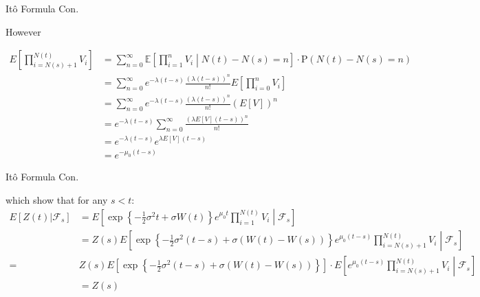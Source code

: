 \documentclass{beamer}
\begin{document}
\begin{frame}{Itô Formula Con.}

    {\footnotesize \footnotesize
    \par However

    \[
    \begin{aligned}
    E \left[ \prod_{i=N(s)+1}^{N(t)} V_i \right] 
    &=\sum_{n=0}^{\infty} \mathbb{E} \left[ \prod_{i=1}^{n} V_i \middle| N(t)-N(s) = n \right] \cdot \text{P}(N(t)-N(s) = n)\\
    &= \sum_{n=0}^{\infty} e^{-\lambda (t-s)} \frac{(\lambda (t-s))^n}{n!} E \left[ \prod_{i=0}^{n} V_i \right] \\
    &= \sum_{n=0}^{\infty} e^{-\lambda (t-s)} \frac{(\lambda (t-s))^n}{n!} (E [V])^n \\
    &= e^{-\lambda (t-s)} \sum_{n=0}^{\infty} \frac{(\lambda E [V] (t-s))^n}{n!} \\
    &= e^{-\lambda (t-s)} e^{\lambda E [V] (t-s)} \\
    &= e^{-\mu_0 (t-s)}
    \end{aligned}
    \]
    }
    
\end{frame}


\begin{frame}{Itô Formula Con.}

    {\footnotesize \footnotesize
    \par which show that for any $s<t$:
    \[
    \begin{aligned}
    E [Z(t) | \mathcal{F}_s] &= E \left[ \exp \left\{ -\frac{1}{2} \sigma^2 t + \sigma W(t) \right\} e^{\mu_0 t} \prod_{i=1}^{N(t)} V_i \middle| \mathcal{F}_s \right] \\
    &= Z(s) E \left[ \exp \left\{ -\frac{1}{2} \sigma^2 (t-s) + \sigma (W(t) - W(s)) \right\} e^{\mu_0 (t-s)} \prod_{i=N(s)+1}^{N(t)} V_i \middle| \mathcal{F}_s \right] \\
    = &Z(s) E \left[ \exp \left\{ -\frac{1}{2} \sigma^2 (t-s) + \sigma (W(t) - W(s)) \right\}\right]\cdot
    E \left[ e^{\mu_0 (t-s)} \prod_{i=N(s)+1}^{N(t)} V_i \middle| \mathcal{F}_s \right] \\
    &= Z(s)
    \end{aligned}
    \]

    }
    
\end{frame}
\end{document}
